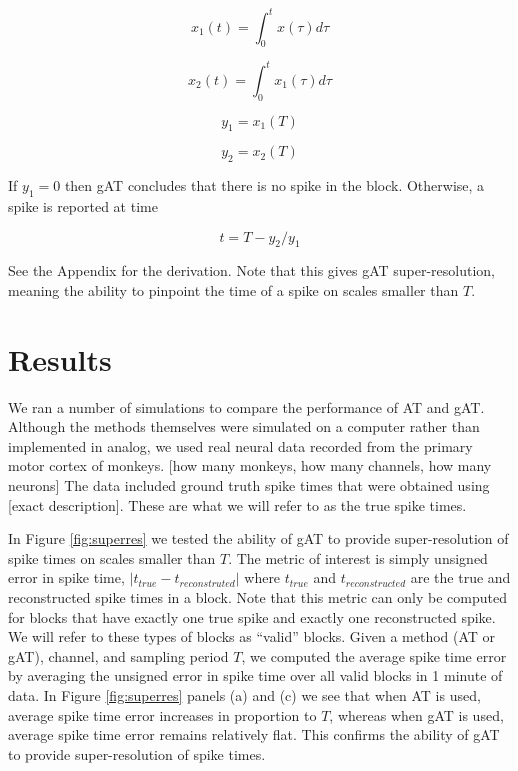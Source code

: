 \documentclass[journal]{IEEEtran}
\begin{document}
\begin{equation}
x_1(t) = \int_0^t x(\tau) d\tau
\end{equation}

\begin{equation}
x_2(t) = \int_0^t x_1(\tau) d\tau
\end{equation}

\begin{equation}
y_1 = x_1(T)
\end{equation}

\begin{equation}
y_2 = x_2(T)
\end{equation}

If $y_1 = 0$ then gAT concludes that there is no spike in the block. Otherwise, a spike is reported at time

\begin{equation}
t = T - y_2/y_1
\end{equation}

See the Appendix for the derivation. Note that this gives gAT super-resolution, meaning the ability to pinpoint the time of a spike on scales smaller than $T$.

\section{Results}

We ran a number of simulations to compare the performance of AT and gAT. Although the methods themselves were simulated on a computer rather than implemented in analog, we used real neural data recorded from the primary motor cortex of monkeys. [how many monkeys, how many channels, how many neurons] The data included ground truth spike times that were obtained using [exact description]. These are what we will refer to as the true spike times.

In Figure \ref{fig:superres} we tested the ability of gAT to provide super-resolution of spike times on scales smaller than $T$. The metric of interest is simply unsigned error in spike time, \mbox{$|t_{true} - t_{reconstruted}|$} where $t_{true}$ and $t_{reconstructed}$ are the true and reconstructed spike times in a block. Note that this metric can only be computed for blocks that have exactly one true spike and exactly one reconstructed spike. We will refer to these types of blocks as ``valid'' blocks. Given a method (AT or gAT), channel, and sampling period $T$, we computed the average spike time error by averaging the unsigned error in spike time over all valid blocks in 1 minute of data. In Figure \ref{fig:superres} panels (a) and (c) we see that when AT is used, average spike time error increases in proportion to $T$, whereas when gAT is used, average spike time error remains relatively flat. This confirms the ability of gAT to provide super-resolution of spike times.
\end{document}
